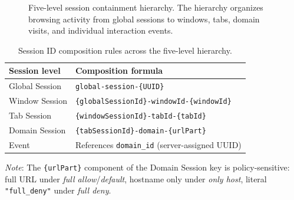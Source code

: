 \documentclass[preprint,12pt,a4paper]{elsarticle}
\begin{document}
  \begin{figure}[htbp]
    \centering
    \caption{Five-level session containment hierarchy. The hierarchy organizes browsing activity from global sessions to windows, tabs, domain visits, and individual interaction events.}
    \label{fig:session_hierarchy}
  \end{figure}

\begin{table}[htbp]
\caption{Session ID composition rules across the five-level hierarchy.}
\label{tab:session_ids}

\centering
\small
\begin{tabular}{ll}
\toprule
\textbf{Session level} & \textbf{Composition formula} \\
\midrule

Global Session
  & \texttt{global-session-\{UUID\}} \\

Window Session
  & \texttt{\{globalSessionId\}-windowId-\{windowId\}} \\

Tab Session
  & \texttt{\{windowSessionId\}-tabId-\{tabId\}} \\

Domain Session
  & \texttt{\{tabSessionId\}-domain-\{urlPart\}} \\

Event
  & References \texttt{domain\_id} (server-assigned UUID) \\

\bottomrule
\end{tabular}

\vspace{0.5em}
\parbox{\linewidth}{
\textit{Note}: The \texttt{\{urlPart\}} component of the Domain Session key is
policy-sensitive: full URL under \emph{full allow}/\emph{default},
hostname only under \emph{only host}, literal \texttt{"full\_deny"}
under \emph{full deny}.
}
\end{table}
\end{document}
